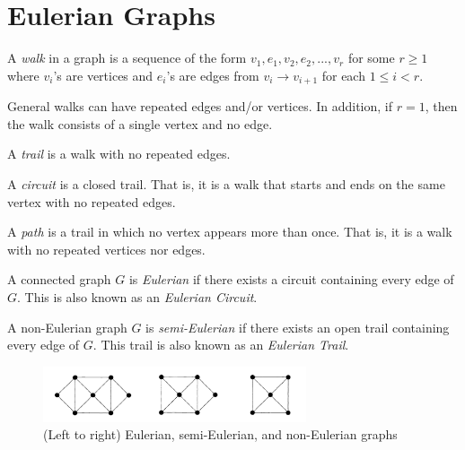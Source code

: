 \section{Eulerian Graphs}

\begin{definition}[Walks]
  A \textit{walk} in a graph is a sequence of the form \(v_1, e_1, v_2, e_2,
  ..., v_r\) for some \(r \geq 1\) where \(v_i\)'s are vertices and
  \(e_i\)'s are edges from \(v_i \to v_{i+1}\) for each \(1 \leq i < r\).
\end{definition}

\begin{remark}
  General walks can have repeated edges and/or vertices. In addition, if 
  \(r = 1\), then the walk consists of a single vertex and no edge.
\end{remark}

\begin{definition}[Trails]
  A \textit{trail} is a walk with no repeated edges.
\end{definition}

\begin{definition}[Circuits]
  A \textit{circuit} is a closed trail. That is, it is a walk that starts and
  ends on the same vertex with no repeated edges.
\end{definition}

\begin{definition}
  A \textit{path} is a trail in which no vertex appears more than once. That is,
  it is a walk with no repeated vertices nor edges.
\end{definition}

\begin{definition}
  A connected graph \(G\) is \textit{Eulerian} if there exists a circuit containing
  every edge of \(G\). This is also known as an \textit{Eulerian Circuit}.
\end{definition}

\begin{definition}
  A non-Eulerian graph \(G\) is \textit{semi-Eulerian} if there exists an open trail
  containing every edge of \(G\). This trail is also known as an 
  \textit{Eulerian Trail}.
\end{definition}

\begin{figure}[ht]
  \begin{center}
    \includegraphics[width=0.69\textwidth]{figures/l02/eulerian-graphs}
  \end{center}
  \caption{(Left to right) Eulerian, semi-Eulerian, and non-Eulerian graphs}\label{fig:eulerian-graphs}
\end{figure}

